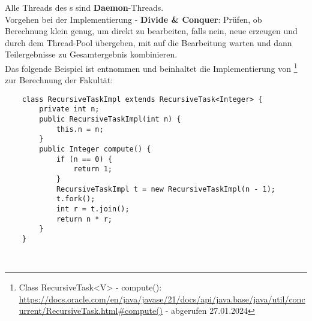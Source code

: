 \noindent
Alle Threads des s sind \textbf{Daemon}-Threads.\\

\noindent
Vorgehen bei der Implementierung - \textbf{Divide \& Conquer}: Prüfen, ob Berechnung klein genug, um direkt zu bearbeiten, falls nein, neue  erzeugen und durch  dem Thread-Pool übergeben, mit  auf die Bearbeitung warten und dann Teilergebnisse zu Gesamtergebnis kombinieren.\\

\noindent
Das folgende Beispiel ist \cite[168, Listing 3.25]{Oec22} entnommen und beinhaltet die Implementierung von \footnote{
    Class RecursiveTask<V> - compute(): \url{https://docs.oracle.com/en/java/javase/21/docs/api/java.base/java/util/concurrent/RecursiveTask.html#compute()} - abgerufen 27.01.2024
} zur Berechnung der Fakultät:
\begin{verbatim}
    class RecursiveTaskImpl extends RecursiveTask<Integer> {
        private int n;
        public RecursiveTaskImpl(int n) {
            this.n = n;
        }
        public Integer compute() {
            if (n == 0) {
                return 1;
            }
            RecursiveTaskImpl t = new RecursiveTaskImpl(n - 1);
            t.fork();
            int r = t.join();
            return n * r;
        }
    }
\end{verbatim}\\